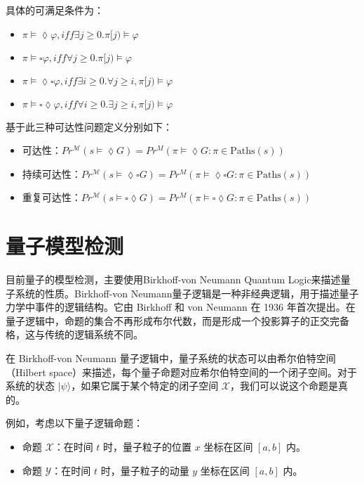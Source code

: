 具体的可满足条件为：
\begin{itemize}
    \item \(\pi\models\lozenge\varphi,iff\exists j\ge0.\pi[j)\models\varphi\)
    \item \(\pi\models\square\varphi,iff\forall j\ge 0.\pi[j)\models\varphi\)
    \item \(\pi\models\lozenge\square\varphi,iff\exists i\ge 0.\forall j\ge i,\pi[j)\models\varphi\)
    \item \(\pi\models\square\lozenge\varphi,iff\forall i\ge 0.\exists j\ge i,\pi[j)\models\varphi\)
\end{itemize}
基于此三种可达性问题定义分别如下：
\begin{itemize}
    \item 可达性：\( Pr^{\mathcal{M}}(s \models \lozenge G) = Pr^M(\pi \models \lozenge G : \pi \in \text{Paths}(s))\)
    \item 持续可达性：\( Pr^{\mathcal{M}}(s \models \lozenge \square G) = Pr^M(\pi \models \lozenge \square G : \pi \in \text{Paths}(s))\)
    \item 重复可达性：\( Pr^{\mathcal{M}}(s \models\square \lozenge G) = Pr^M(\pi \models \square\lozenge G : \pi \in \text{Paths}(s))\)
\end{itemize}

\section{量子模型检测}
目前量子的模型检测，主要使用Birkhoff-von Neumann Quantum Logic来描述量子系统的性质\citep{birkhoff1987logic}。Birkhoff-von Neumann量子逻辑是一种非经典逻辑，用于描述量子力学中事件的逻辑结构。它由 Birkhoff 和 von Neumann 在 1936 年首次提出。在量子逻辑中，命题的集合不再形成布尔代数，而是形成一个投影算子的正交完备格，这与传统的逻辑系统不同。

在 Birkhoff-von Neumann 量子逻辑中，量子系统的状态可以由希尔伯特空间（Hilbert space）来描述，每个量子命题对应希尔伯特空间的一个闭子空间。对于系统的状态 \(|\psi\rangle\)，如果它属于某个特定的闭子空间 \( \mathcal{X} \)，我们可以说这个命题是真的。

例如，考虑以下量子逻辑命题：

\begin{itemize}
\item 命题 \( \mathcal{X} \)：在时间 \( t \) 时，量子粒子的位置 \( x \) 坐标在区间 \( [a, b] \) 内。
\item 命题 \( \mathcal{Y} \)：在时间 \( t \) 时，量子粒子的动量 \( y \) 坐标在区间 \( [a, b] \) 内。
\end{itemize}

